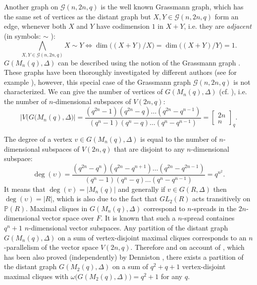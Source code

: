 \documentclass[12pt,a4paper]{article}
\theoremstyle{definition}
\begin{document}
Another graph on $\mathscr{G}(n, 2n, q)$ is the well known Grassmann graph, which has the same set of vertices as the distant graph but $X, Y \in \mathscr{G}(n, 2n, q)$ form an edge, whenever both $X$ and $Y$ have codimension  $1$ in $X+Y$, i.e. they are {\sl adjacent} (in symbols: $\sim$ ):
$$\bigwedge_{X, Y \in \mathscr{G}(n, 2n, q)}X\sim Y \Leftrightarrow \dim\big((X+Y)/X\big)=\dim\big((X+Y)/Y\big)=1.$$
$G(M_n(q), \Delta)$ can be described using the notion of the Grassmann graph \cite[Theorem 3.2]{hav 4}. These graphs have been thoroughly investigated by different authors (see for
example \cite{metsch}), however, this special case of the Grassmann graph $\mathscr{G}(n, 2n, q)$ is not characterized.\newline
We can give the number of vertices of $G(M_n(q), \Delta)$ (cf. \cite[p. 920]{design}), i.e. the number of $n$-dimensional subspaces of $V(2n, q)$:
$$|V\bigl(G(M_n(q), \Delta\bigr)|=\frac{(q^{2n}-1)(q^{2n}-q)\ldots(q^{2n}-q^{n-1})}{(q^n-1)(q^n-q)\ldots(q^n-q^{n-1})}=\left[\begin{array}{cclr}
2n \\n
\end{array}\right]_q.$$

The degree of a vertex $v\in G(M_n(q), \Delta)$ is equal to the number of $n$-dimensional subspaces of $V(2n, q)$ that are disjoint to any $n$-dimensional subspace:
$$\deg(\upsilon)=\frac{(q^{2n}-q^n)(q^{2n}-q^{n+1})\ldots(q^{2n}-q^{2n-1})}{(q^n-1)(q^n-q)\ldots(q^n-q^{n-1})}=q^{n^2}.$$
It means that $\deg(v)=|M_n(q)|$ and generally if $v\in G(R, \Delta)$ then $\deg(\upsilon)=|R|$, which is also due to the fact that $GL_2(R)$ acts transitively on $\mathbb{P}(R)$. 
Maximal cliques in $G(M_n(q), \Delta)$ correspond to $n$-spreads in the $2n$-dimensional vector space over $F$. It is known that such a $n$-spread containes $q^n+1$ $n$-dimensional vector subspaces. 
Any partition of the distant graph $G(M_n(q), \Delta)$ on a sum of vertex-disjoint maximal cliques corresponds to 
an $n$-parallelism of the vector space $V(2n, q)$. Therefore and on account of \cite[Theorem 1.]{parallelism}, which has been also proved (independently) by Denniston \cite{packing}, there exists a partition of the distant graph $G(M_2(q), \Delta)$ on a sum of $q^2+q+1$ vertex-disjoint maximal cliques with  $\omega\bigl(G(M_2(q), \Delta)\bigr)=q^2+1$ for any $q$.\break
\end{document}

